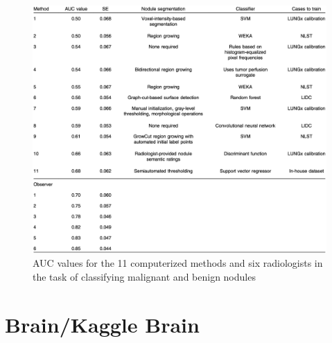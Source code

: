 \begin{figure}[!h]
\centering
\includegraphics[width=1\textwidth, keepaspectratio=true]{./figures/LUNGx_challenge_all_results.png}
\caption{AUC values for the 11 computerized methods and six radiologists in the task of classifying malignant and benign nodules~\cite{12}}
\label{fig:LUNGx_challenge_all_results}
\end{figure}



\section{Brain/Kaggle Brain}

